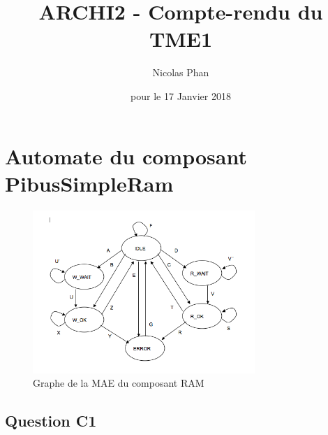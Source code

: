 \documentclass{article}
\title{ARCHI2 - Compte-rendu du TME1}
\author{Nicolas Phan}
\date{pour le 17 Janvier 2018}
\begin{document}
\pagestyle{headings}
\maketitle
\tableofcontents
\newpage



\section{Automate du composant PibusSimpleRam}

\begin{figure}[H]
\includegraphics[width=0.75\textwidth]{pics/mae_ram.png}
\centering
\caption{Graphe de la MAE du composant RAM}
\label{mae_ram}
\end{figure}

\subsection{Question C1}
\end{document}

